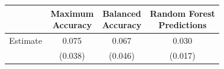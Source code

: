 \begin{threeparttable}
\begin{tabular}{l | c c c}
\toprule
 & \shortstack{Maximum \\ Accuracy} & \shortstack{Balanced \\ Accuracy} & \shortstack{Random Forest \\ Predictions} \\
\midrule
  Estimate & 0.075 & 0.067 & 0.030 \\
           & (0.038) & (0.046) & (0.017) \\
\bottomrule
\end{tabular}
\end{threeparttable}
